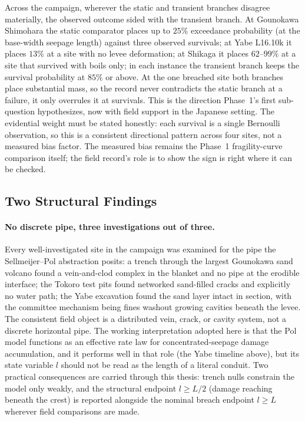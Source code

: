 Across the campaign, wherever the static and transient branches disagree
materially, the observed outcome sided with the transient branch. At
Gounokawa Shimohara the static comparator places up to $25\%$ exceedance
probability (at the base-width seepage length) against three observed
survivals; at Yabe L16.10k it places $13\%$ at a site with no levee
deformation; at Shikaga it places $62$--$99\%$ at a site that survived with
boils only; in each instance the transient branch keeps the survival
probability at $85\%$ or above. At the one breached site both branches place
substantial mass, so the record never contradicts the static branch at a
failure, it only overrules it at survivals. This is the direction Phase~1's
first sub-question hypothesizes, now with field support in the Japanese
setting. The evidential weight must be stated honestly: each survival is a
single Bernoulli observation, so this is a consistent directional pattern
across four sites, not a measured bias factor. The measured bias remains the
Phase~1 fragility-curve comparison itself; the field record's role is to
show the sign is right where it can be checked.

\subsection{Two Structural Findings}
\label{subsec: Two Structural Findings from the Japanese Cases}

\paragraph{No discrete pipe, three investigations out of three.} Every
well-investigated site in the campaign was examined for the pipe the
Sellmeijer--Pol abstraction posits: a trench through the largest Gounokawa
sand volcano found a vein-and-clod complex in the blanket and no pipe at the
erodible interface; the Tokoro test pits found networked sand-filled cracks
and explicitly no water path; the Yabe excavation found the sand layer
intact in section, with the committee mechanism being fines washout growing
cavities beneath the levee. The consistent field object is a distributed
vein, crack, or cavity system, not a discrete horizontal pipe. The working
interpretation adopted here is that the Pol model functions as an effective
rate law for concentrated-seepage damage accumulation, and it performs well
in that role (the Yabe timeline above), but its state variable $l$ should
not be read as the length of a literal conduit. Two practical consequences
are carried through this thesis: trench nulls constrain the model only
weakly, and the structural endpoint $l \geq L/2$ (damage reaching beneath
the crest) is reported alongside the nominal breach endpoint $l \geq L$
wherever field comparisons are made.

